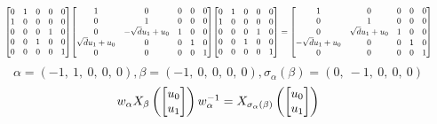\documentclass[11pt]{article}
\theoremstyle{definition}
\begin{document}
\[
\scaletoalign{\textwidth}{{\left[\begin{matrix}0 & 1 & 0 & 0 & 0\\1 & 0 & 0 & 0 & 0\\0 & 0 & 0 & 1 & 0\\0 & 0 & 1 & 0 & 0\\0 & 0 & 0 & 0 & 1\end{matrix}\right]} {\left[\begin{matrix}1 & 0 & 0 & 0 & 0\\0 & 1 & 0 & 0 & 0\\0 & - \sqrt{d} u_{1} + u_{0} & 1 & 0 & 0\\\sqrt{d} u_{1} + u_{0} & 0 & 0 & 1 & 0\\0 & 0 & 0 & 0 & 1\end{matrix}\right]} {\left[\begin{matrix}0 & 1 & 0 & 0 & 0\\1 & 0 & 0 & 0 & 0\\0 & 0 & 0 & 1 & 0\\0 & 0 & 1 & 0 & 0\\0 & 0 & 0 & 0 & 1\end{matrix}\right]} = {\left[\begin{matrix}1 & 0 & 0 & 0 & 0\\0 & 1 & 0 & 0 & 0\\0 & \sqrt{d} u_{1} + u_{0} & 1 & 0 & 0\\- \sqrt{d} u_{1} + u_{0} & 0 & 0 & 1 & 0\\0 & 0 & 0 & 0 & 1\end{matrix}\right]}}
\]
\[
\alpha = \left( -1, \  1, \  0, \  0, \  0\right), \beta = \left( -1, \  0, \  0, \  0, \  0\right), \sigma_{\alpha}(\beta) = \left( 0, \  -1, \  0, \  0, \  0\right)
\]
\[
\scaletoalign{\textwidth}{w_{\alpha} X_{\beta}\left(\left[\begin{matrix}u_{0}\\u_{1}\end{matrix}\right]\right) w_{\alpha}^{-1} = X_{\sigma_{\alpha}\left(\beta\right)}\left(\left[\begin{matrix}u_{0}\\u_{1}\end{matrix}\right]\right)}
\]
\end{document}
